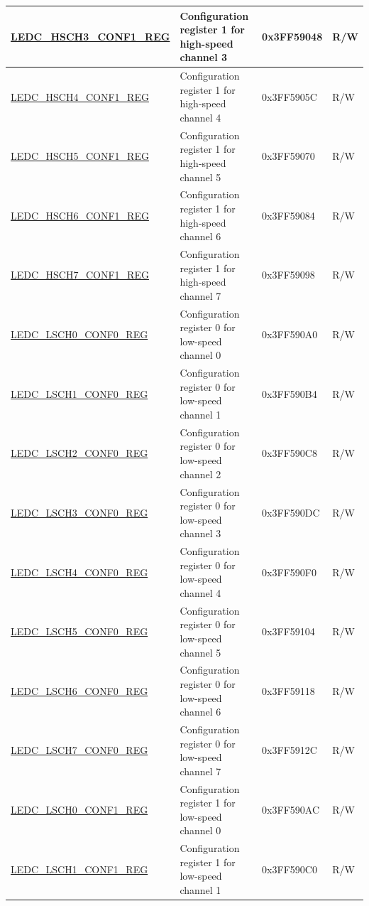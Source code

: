 \begin{longtable}{ | p{4.7cm} | p{7.3cm} | p{2cm} | p{1cm} | }
\hyperref[regdesc:LEDCHSCHnCONF1REG]{LEDC\_HSCH3\_CONF1\_REG} & Configuration register 1 for high-speed channel 3 & 0x3FF59048 & R/W \\ \hline
\hyperref[regdesc:LEDCHSCHnCONF1REG]{LEDC\_HSCH4\_CONF1\_REG} & Configuration register 1 for high-speed channel 4 & 0x3FF5905C & R/W \\ \hline
\hyperref[regdesc:LEDCHSCHnCONF1REG]{LEDC\_HSCH5\_CONF1\_REG} & Configuration register 1 for high-speed channel 5 & 0x3FF59070 & R/W \\ \hline
\hyperref[regdesc:LEDCHSCHnCONF1REG]{LEDC\_HSCH6\_CONF1\_REG} & Configuration register 1 for high-speed channel 6 & 0x3FF59084 & R/W \\ \hline
\hyperref[regdesc:LEDCHSCHnCONF1REG]{LEDC\_HSCH7\_CONF1\_REG} & Configuration register 1 for high-speed channel 7 & 0x3FF59098 & R/W \\ \hline
\hyperref[regdesc:LEDCLSCHnCONF0REG]{LEDC\_LSCH0\_CONF0\_REG} & Configuration register 0 for low-speed channel 0 & 0x3FF590A0 & R/W \\ \hline
\hyperref[regdesc:LEDCLSCHnCONF0REG]{LEDC\_LSCH1\_CONF0\_REG} & Configuration register 0 for low-speed channel 1 & 0x3FF590B4 & R/W \\ \hline
\hyperref[regdesc:LEDCLSCHnCONF0REG]{LEDC\_LSCH2\_CONF0\_REG} & Configuration register 0 for low-speed channel 2 & 0x3FF590C8 & R/W \\ \hline
\hyperref[regdesc:LEDCLSCHnCONF0REG]{LEDC\_LSCH3\_CONF0\_REG} & Configuration register 0 for low-speed channel 3 & 0x3FF590DC & R/W \\ \hline
\hyperref[regdesc:LEDCLSCHnCONF0REG]{LEDC\_LSCH4\_CONF0\_REG} & Configuration register 0 for low-speed channel 4 & 0x3FF590F0 & R/W \\ \hline
\hyperref[regdesc:LEDCLSCHnCONF0REG]{LEDC\_LSCH5\_CONF0\_REG} & Configuration register 0 for low-speed channel 5 & 0x3FF59104 & R/W \\ \hline
\hyperref[regdesc:LEDCLSCHnCONF0REG]{LEDC\_LSCH6\_CONF0\_REG} & Configuration register 0 for low-speed channel 6 & 0x3FF59118 & R/W \\ \hline
\hyperref[regdesc:LEDCLSCHnCONF0REG]{LEDC\_LSCH7\_CONF0\_REG} & Configuration register 0 for low-speed channel 7 & 0x3FF5912C & R/W \\ \hline
\hyperref[regdesc:LEDCLSCHnCONF1REG]{LEDC\_LSCH0\_CONF1\_REG} & Configuration register 1 for low-speed channel 0 & 0x3FF590AC & R/W \\ \hline
\hyperref[regdesc:LEDCLSCHnCONF1REG]{LEDC\_LSCH1\_CONF1\_REG} & Configuration register 1 for low-speed channel 1 & 0x3FF590C0 & R/W \\ \hline

\end{longtable}
